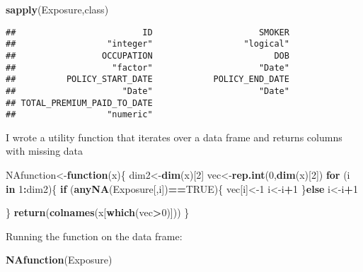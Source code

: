\documentclass[]{article}
\newenvironment{Shaded}{\begin{snugshade}}{\end{snugshade}}
\newcommand{\KeywordTok}[1]{\textcolor[rgb]{0.13,0.29,0.53}{\textbf{#1}}}
\newcommand{\DecValTok}[1]{\textcolor[rgb]{0.00,0.00,0.81}{#1}}
\newcommand{\OtherTok}[1]{\textcolor[rgb]{0.56,0.35,0.01}{#1}}
\newcommand{\ControlFlowTok}[1]{\textcolor[rgb]{0.13,0.29,0.53}{\textbf{#1}}}
\newcommand{\OperatorTok}[1]{\textcolor[rgb]{0.81,0.36,0.00}{\textbf{#1}}}
\newcommand{\NormalTok}[1]{#1}
\begin{document}
\begin{Shaded}
\begin{Highlighting}[]
\KeywordTok{sapply}\NormalTok{(Exposure,class)}
\end{Highlighting}
\end{Shaded}

\begin{verbatim}
##                         ID                     SMOKER 
##                  "integer"                  "logical" 
##                 OCCUPATION                        DOB 
##                   "factor"                     "Date" 
##          POLICY_START_DATE            POLICY_END_DATE 
##                     "Date"                     "Date" 
## TOTAL_PREMIUM_PAID_TO_DATE 
##                  "numeric"
\end{verbatim}

I wrote a utility function that iterates over a data frame and returns
columns with missing data

\begin{Shaded}
\begin{Highlighting}[]
\NormalTok{NAfunction<-}\ControlFlowTok{function}\NormalTok{(x)\{}
\NormalTok{  dim2<-}\KeywordTok{dim}\NormalTok{(x)[}\DecValTok{2}\NormalTok{]}
\NormalTok{  vec<-}\KeywordTok{rep.int}\NormalTok{(}\DecValTok{0}\NormalTok{,}\KeywordTok{dim}\NormalTok{(x)[}\DecValTok{2}\NormalTok{])}
  \ControlFlowTok{for}\NormalTok{ (i }\ControlFlowTok{in} \DecValTok{1}\OperatorTok{:}\NormalTok{dim2)\{}
    \ControlFlowTok{if}\NormalTok{ (}\KeywordTok{anyNA}\NormalTok{(Exposure[,i])}\OperatorTok{==}\OtherTok{TRUE}\NormalTok{)\{}
\NormalTok{      vec[i]<-}\DecValTok{1}
\NormalTok{      i<-i}\OperatorTok{+}\DecValTok{1}
\NormalTok{    \}}\ControlFlowTok{else}
\NormalTok{      i<-i}\OperatorTok{+}\DecValTok{1}

\NormalTok{  \}}
  \KeywordTok{return}\NormalTok{(}\KeywordTok{colnames}\NormalTok{(x[}\KeywordTok{which}\NormalTok{(vec}\OperatorTok{>}\DecValTok{0}\NormalTok{)]))}
\NormalTok{\}}
\end{Highlighting}
\end{Shaded}

Running the function on the data frame:

\begin{Shaded}
\begin{Highlighting}[]
\KeywordTok{NAfunction}\NormalTok{(Exposure)}
\end{Highlighting}
\end{Shaded}
\end{document}
